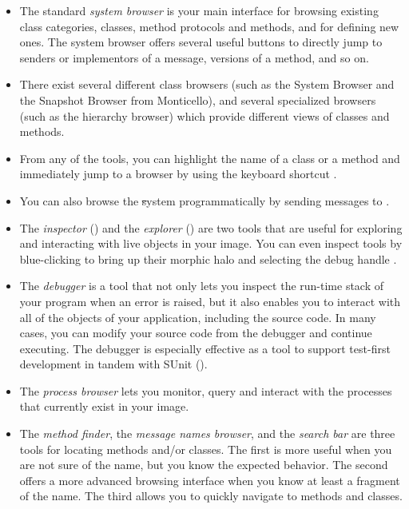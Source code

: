 \documentclass[a4paper,10pt,twoside]{book}
\begin{document}
\begin{itemize}
  \item The standard \emph{system browser} is your main interface for browsing existing class categories, classes, method protocols and methods, and for defining new ones.
  The system browser offers several useful buttons to directly jump to senders or implementors of a message, versions of a method, and so on.
  \item There exist several different class browsers (such as the System Browser and the Snapshot Browser from Monticello), and several specialized browsers (such as the hierarchy browser) which provide different views of classes and methods.
  \item From any of the tools, you can highlight the name of a class or a method and immediately jump to a browser by using the keyboard shortcut .
  \item You can also browse the \st system programmatically by sending messages to .
  \item The \emph{inspector} () and the \emph{explorer} () are two tools that are useful for exploring and interacting with live objects in your image.
  You can even inspect tools by blue-clicking to bring up their morphic halo and selecting the debug handle \debugHandle.
  \item The \emph{debugger} is a tool that not only lets you inspect the run-time stack of your program when an error is raised, but it also enables you to interact with all of the objects of your application, including the source code.
  In many cases, you can modify your source code from the debugger and continue executing.
  The debugger is especially effective as a tool to support test-first development in tandem with SUnit ().
  \item The \emph{process browser} lets you monitor, query and interact with the processes that currently exist in your image.
  \item The \emph{method finder}, the \emph{message names browser}, and the \emph{search bar} are three tools for locating methods and/or classes.
  The first is more useful when you are not sure of the name, but you know the expected behavior.
  The second offers a more advanced browsing interface when you know at least a fragment of the name.
  The third allows you to quickly navigate to methods and classes.
\end{itemize}

\ifx\wholebook\relax\else
\end{document}
